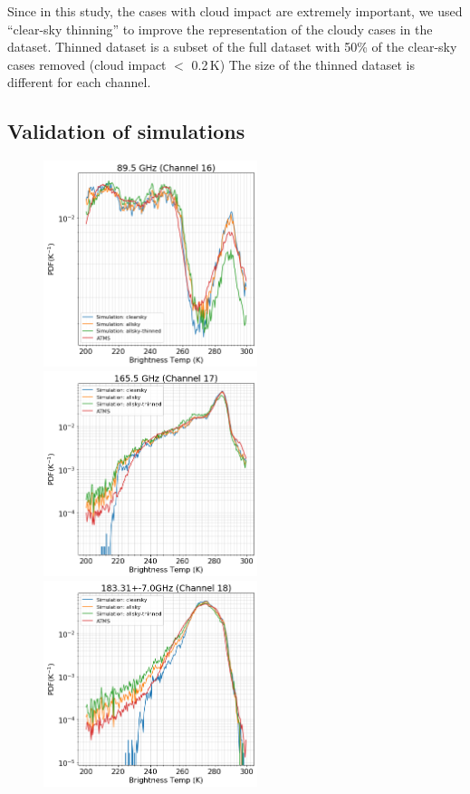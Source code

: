 \documentclass[12pt]{article}
\begin{document}
Since in this study, the cases with cloud impact are extremely important, we used ``clear-sky thinning'' to improve the representation of the cloudy cases in the dataset. Thinned dataset is a subset of the full dataset with 50\% of the clear-sky cases removed (cloud impact $<$ 0.2\,K) The size of the thinned dataset is different for each channel. 

\subsection{Validation of simulations}
\label{sec:validation}
%
\begin{figure}[p]
	\centering
	\includegraphics[height=60mm]{ATMS_C16_distribution}\hspace{5mm}%
	\includegraphics[height=60mm]{ATMS_C17_distribution}
	\includegraphics[height=60mm]{ATMS_C18_distribution}\hspace{5mm}%

\end{figure}
\end{document}
